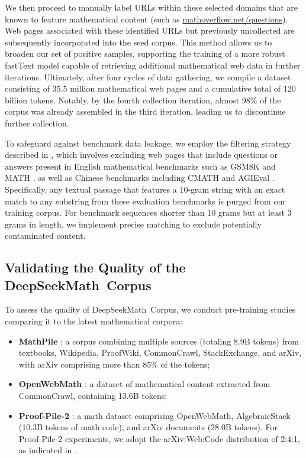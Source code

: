 We then proceed to manually label URLs within these selected domains that are known to feature mathematical content (such as \url{mathoverflow.net/questions}). Web pages associated with these identified URLs but previously uncollected are subsequently incorporated into the seed corpus. This method allows us to broaden our set of positive samples, supporting the training of a more robust fastText model capable of retrieving additional mathematical web data in further iterations. Ultimately, after four cycles of data gathering, we compile a dataset consisting of 35.5 million mathematical web pages and a cumulative total of 120 billion tokens. Notably, by the fourth collection iteration, almost 98\% of the corpus was already assembled in the third iteration, leading us to discontinue further collection.

To safeguard against benchmark data leakage, we employ the filtering strategy described in \cite{deepseek-coder}, which involves excluding web pages that include questions or answers present in English mathematical benchmarks such as GSM8K \citep{gsm8k} and MATH \citep{MATH}, as well as Chinese benchmarks including CMATH \citep{wei2023cmath} and AGIEval \citep{agieval}. Specifically, any textual passage that features a 10-gram string with an exact match to any substring from these evaluation benchmarks is purged from our training corpus. For benchmark sequences shorter than 10 grams but at least 3 grams in length, we implement precise matching to exclude potentially contaminated content.

\subsection{Validating the Quality of the DeepSeekMath~Corpus}

To assess the quality of DeepSeekMath~Corpus, we conduct pre-training studies comparing it to the latest mathematical corpora:

\begin{itemize}[topsep=0pt]
    \item \textbf{MathPile} \citep{mathpile}: a corpus combining multiple sources (totaling 8.9B tokens) from textbooks, Wikipedia, ProofWiki, CommonCrawl, StackExchange, and arXiv, with arXiv comprising more than 85\% of the tokens;
    \item \textbf{OpenWebMath} \citep{openwebmath}: a dataset of mathematical content extracted from CommonCrawl, containing 13.6B tokens;
    \item \textbf{Proof-Pile-2} \citep{llemma}: a math dataset comprising OpenWebMath, AlgebraicStack (10.3B tokens of math code), and arXiv documents (28.0B tokens). For Proof-Pile-2 experiments, we adopt the arXiv:Web:Code distribution of 2:4:1, as indicated in \cite{llemma}.
\end{itemize}

